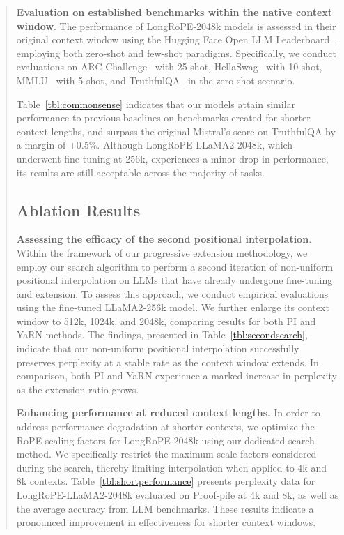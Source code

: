 \begin{abstract}
\textbf{Evaluation on established benchmarks within the native context window}. The performance of LongRoPE-2048k models is assessed in their original context window using the Hugging Face Open LLM Leaderboard~\cite{huggingfaceboard}, employing both zero-shot and few-shot paradigms. Specifically, we conduct evaluations on ARC-Challenge~\cite{allenai:arc} with 25-shot, HellaSwag~\cite{zellers2019hellaswag} with 10-shot, MMLU~\cite{mmlu} with 5-shot, and TruthfulQA~\cite{lin2021truthfulqa} in the zero-shot scenario.

Table~\ref{tbl:commonsense} indicates that our models attain similar performance to previous baselines on benchmarks created for shorter context lengths, and surpass the original Mistral's score on TruthfulQA by a margin of +0.5\%. Although LongRoPE-LLaMA2-2048k, which underwent fine-tuning at 256k, experiences a minor drop in performance, its results are still acceptable across the majority of tasks.

\subsection{Ablation Results}

\textbf{Assessing the efficacy of the second positional interpolation}. Within the framework of our progressive extension methodology, we employ our search algorithm to perform a second iteration of non-uniform positional interpolation on LLMs that have already undergone fine-tuning and extension. To assess this approach, we conduct empirical evaluations using the fine-tuned LLaMA2-256k model. We further enlarge its context window to 512k, 1024k, and 2048k, comparing results for both PI and YaRN methods. The findings, presented in Table~\ref{tbl:secondsearch}, indicate that our non-uniform positional interpolation successfully preserves perplexity at a stable rate as the context window extends. In comparison, both PI and YaRN experience a marked increase in perplexity as the extension ratio grows.

\textbf{Enhancing performance at reduced context lengths.} In order to address performance degradation at shorter contexts, we optimize the RoPE scaling factors for LongRoPE-2048k using our dedicated search method. We specifically restrict the maximum scale factors considered during the search, thereby limiting interpolation when applied to 4k and 8k contexts. Table~\ref{tbl:shortperformance} presents perplexity data for LongRoPE-LLaMA2-2048k evaluated on Proof-pile at 4k and 8k, as well as the average accuracy from LLM benchmarks. These results indicate a pronounced improvement in effectiveness for shorter context windows.


\end{abstract}
